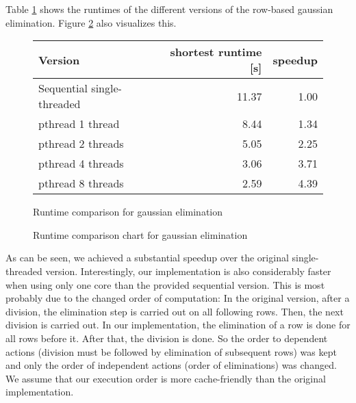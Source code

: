 \documentclass[]{article}
\begin{document}
Table \ref{tab:gauss-runtime} shows the runtimes of the different versions of the row-based gaussian elimination. Figure \ref{fig:gauss-chart} also visualizes this.

\begin{figure}[h]
	\centering
	\begin{tabular}{|l|r|r|}
		\hline
		\textbf{Version} & \textbf{shortest runtime [s]} & \textbf{speedup} \\
		\hline
		Sequential single-threaded		& 11.37 & 1.00 \\ 
		\hline 
		pthread 1 thread				& 8.44 & 1.34 \\ 
		\hline 
		pthread 2 threads				& 5.05 & 2.25 \\ 
		\hline 
		pthread 4 threads 				& 3.06 & 3.71 \\ 
		\hline 
		pthread 8 threads				& 2.59 & 4.39 \\ 
		\hline 
	\end{tabular} 
	\caption{Runtime comparison for gaussian elimination}
	\label{tab:gauss-runtime}
\end{figure}

\begin{figure}[h]
	\centering
	\caption{Runtime comparison chart for gaussian elimination}
	\label{fig:gauss-chart}
\end{figure}

As can be seen, we achieved a substantial speedup over the original single-threaded version.
Interestingly, our implementation is also considerably faster when using only one core than the provided sequential version.
This is most probably due to the changed order of computation: In the original version, after a division, the elimination step is carried out on all following rows. Then, the next division is carried out. In our implementation, the elimination of a row is done for all rows before it. After that, the division is done. So the order to dependent actions (division must be followed by elimination of subsequent rows) was kept and only the order of independent actions (order of eliminations) was changed.
We assume that our execution order is more cache-friendly than the original implementation.
\end{document}
